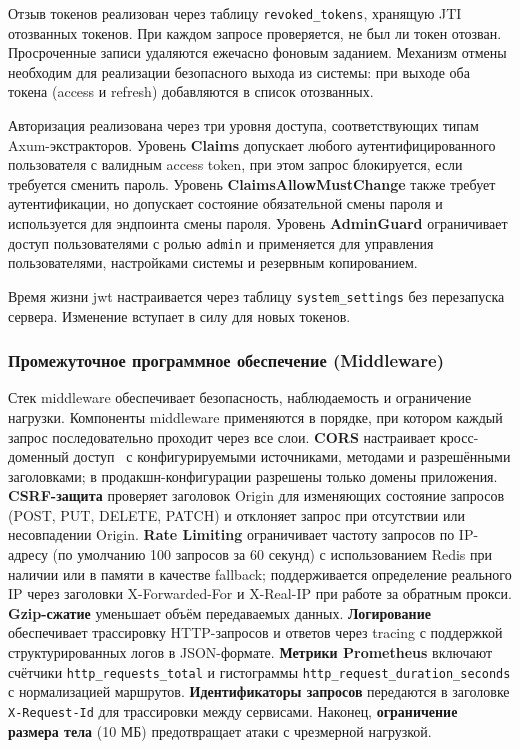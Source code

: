 Отзыв токенов реализован через таблицу \texttt{revoked\_tokens}, хранящую JTI отозванных токенов. При каждом запросе проверяется, не был ли токен отозван. Просроченные записи удаляются ежечасно фоновым заданием. Механизм отмены необходим для реализации безопасного выхода из системы: при выходе оба токена (access и refresh) добавляются в список отозванных.

Авторизация реализована через три уровня доступа, соответствующих типам Axum-экстракторов. Уровень \textbf{Claims} допускает любого аутентифицированного пользователя с валидным access token, при этом запрос блокируется, если требуется сменить пароль. Уровень \textbf{ClaimsAllowMustChange} также требует аутентификации, но допускает состояние обязательной смены пароля и используется для эндпоинта смены пароля. Уровень \textbf{AdminGuard} ограничивает доступ пользователями с ролью \texttt{admin} и применяется для управления пользователями, настройками системы и резервным копированием.

Время жизни \acrshort{jwt} настраивается через таблицу \texttt{system\_settings} без перезапуска сервера. Изменение вступает в силу для новых токенов.

\subsubsection{Промежуточное программное обеспечение (Middleware)}

Стек middleware обеспечивает безопасность, наблюдаемость и ограничение нагрузки. Компоненты middleware применяются в порядке, при котором каждый запрос последовательно проходит через все слои. \textbf{CORS} настраивает кросс-доменный доступ~\cite{CORS} с конфигурируемыми источниками, методами и разрешёнными заголовками; в продакшн-конфигурации разрешены только домены приложения. \textbf{CSRF-защита} проверяет заголовок Origin для изменяющих состояние запросов (POST, PUT, DELETE, PATCH) и отклоняет запрос при отсутствии или несовпадении Origin. \textbf{Rate Limiting} ограничивает частоту запросов по IP-адресу (по умолчанию 100 запросов за 60 секунд) с использованием Redis при наличии или в памяти в качестве fallback; поддерживается определение реального IP через заголовки X-Forwarded-For и X-Real-IP при работе за обратным прокси. \textbf{Gzip-сжатие} уменьшает объём передаваемых данных. \textbf{Логирование} обеспечивает трассировку HTTP-запросов и ответов через tracing с поддержкой структурированных логов в JSON-формате. \textbf{Метрики Prometheus} включают счётчики \texttt{http\_requests\_total} и гистограммы \texttt{http\_request\_duration\_seconds} с нормализацией маршрутов. \textbf{Идентификаторы запросов} передаются в заголовке \texttt{X-Request-Id} для трассировки между сервисами. Наконец, \textbf{ограничение размера тела} (10 МБ) предотвращает атаки с чрезмерной нагрузкой.

